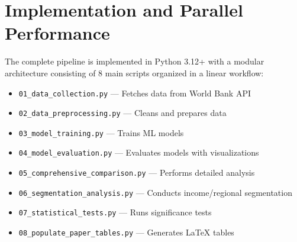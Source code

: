 \documentclass[10pt,twocolumn]{article}
\begin{document}
\section{Implementation and Parallel Performance}
\label{sec:implementation}
\par The complete pipeline is implemented in Python 3.12+ with a modular architecture consisting of 8 main scripts organized in a linear workflow:

\vspace{-0.5em}
\begin{itemize}
\setlength{\itemsep}{0pt}
\setlength{\parskip}{2pt}
\item \texttt{01\_data\_collection.py} --- Fetches data from World Bank API
\item \texttt{02\_data\_preprocessing.py} --- Cleans and prepares data
\item \texttt{03\_model\_training.py} --- Trains ML models
\item \texttt{04\_model\_evaluation.py} --- Evaluates models with visualizations
\item \texttt{05\_comprehensive\_comparison.py} --- Performs detailed analysis
\item \texttt{06\_segmentation\_analysis.py} --- Conducts income/regional segmentation
\item \texttt{07\_statistical\_tests.py} --- Runs significance tests
\item \texttt{08\_populate\_paper\_tables.py} --- Generates LaTeX tables
\end{itemize}
\vspace{-0.5em}
\end{document}
